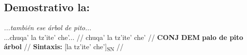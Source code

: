 \documentclass{article}%
\begin{document}
\subsection{Demostrativo la:}%
\label{subsec:Demostrativola}%

%
\par\medskip%
\ex
\textit{...también ese árbol de pito...} \\
\begingl
\gla ...chuqa' la tz'ite' che'... //
\glb chuqa' la tz'ite' che' //
\glc \textbf{CONJ} \textbf{DEM} \textbf{palo de pito} \textbf{árbol} //
\glft \textbf{Sintaxis:} [la tz'ite' che']\textsubscript{SN} //
\endgl
\xe
%
\medskip

%
\end{document}
